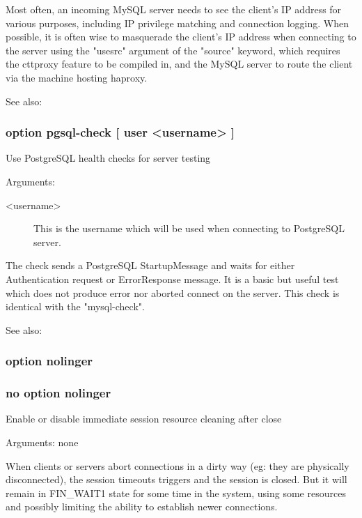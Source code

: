   Most often, an incoming MySQL server needs to see the client's IP address for
  various purposes, including IP privilege matching and connection logging.
  When possible, it is often wise to masquerade the client's IP address when
  connecting to the server using the "usesrc" argument of the "source" keyword,
  which requires the cttproxy feature to be compiled in, and the MySQL server
  to route the client via the machine hosting haproxy.

  See also: 

\subsubsection[option pgsql-check]{option pgsql-check [ user <username> ]}


  Use PostgreSQL health checks for server testing


  Arguments:
\begin{description}
\item[<username>] This is the username which will be used when connecting to
               PostgreSQL server.
\end{description}

  The check sends a PostgreSQL StartupMessage and waits for either
  Authentication request or ErrorResponse message. It is a basic but useful
  test which does not produce error nor aborted connect on the server.
  This check is identical with the "mysql-check".

  See also: 

\subsubsection[option nolinger]{option nolinger}
\subsubsection[no option nolinger]{no option nolinger}


  Enable or disable immediate session resource cleaning after close


  Arguments: none

  When clients or servers abort connections in a dirty way (eg: they are
  physically disconnected), the session timeouts triggers and the session is
  closed. But it will remain in FIN\_WAIT1 state for some time in the system,
  using some resources and possibly limiting the ability to establish newer
  connections.

